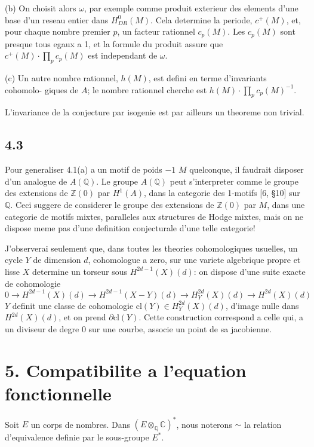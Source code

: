 \documentclass[12pt,a4paper]{article}
\theoremstyle{plain}
\theoremstyle{definition}
\theoremstyle{remark}
\newcommand{\Q}{\mathbb{Q}}
\newcommand{\C}{\mathbb{C}}
\newcommand{\Z}{\mathbb{Z}}
\begin{document}
(b) On choisit alors $\omega$, par exemple comme produit exterieur des elements d'une
base d'un reseau entier dans $H^0_{DR}(M)$. Cela determine la periode, $c^+(M)$, et, pour
chaque nombre premier $p$, un facteur rationnel $c_p(M)$. Les $c_p(M)$ sont presque tous
egaux a 1, et la formule du produit assure que $c^+(M) \cdot \prod_p c_p(M)$ est independant
de $\omega$.

(c) Un autre nombre rationnel, $h(M)$, est defini en terme d'invariants cohomolo-
giques de $A$; le nombre rationnel cherche est $h(M) \cdot \prod_p c_p(M)^{-1}$.

L'invariance de la conjecture par isogenie est par ailleurs un theoreme non trivial.

\subsection*{4.3}

Pour generaliser 4.1(a) a un motif de poids $-1$ $M$ quelconque, il faudrait
disposer d'un analogue de $A(\Q)$. Le groupe $A(\Q)$ peut s'interpreter comme le
groupe des extensions de $\Z(0)$ par $H^1(A)$, dans la categorie des 1-motifs [6, \S 10] sur
$\Q$. Ceci suggere de considerer le groupe des extensions de $\Z(0)$ par $M$, dans une
categorie de motifs mixtes, paralleles aux structures de Hodge mixtes, mais on ne
dispose meme pas d'une definition conjecturale d'une telle categorie!

J'observerai seulement que, dans toutes les theories cohomologiques usuelles, un
cycle $Y$ de dimension $d$, cohomologue a zero, sur une variete algebrique propre et
lisse $X$ determine un torseur sous $H^{2d-1}(X)(d)$: on dispose d'une suite exacte de
cohomologie
\[
0 \to H^{2d-1}(X)(d) \to H^{2d-1}(X - Y)(d) \to H^{2d}_Y(X)(d) \to H^{2d}(X)(d)
\]
$Y$ definit une classe de cohomologie $\text{cl}(Y) \in H^{2d}_Y(X)(d)$, d'image nulle dans
$H^{2d}(X)(d)$, et on prend $\partial \text{cl}(Y)$. Cette construction correspond a celle qui, a un
diviseur de degre 0 sur une courbe, associe un point de sa jacobienne.


\section*{5. Compatibilite a l'equation fonctionnelle}

Soit $E$ un corps de nombres. Dans $(E \otimes_\Q \C)^*$, nous noterons $\sim$ la relation
d'equivalence definie par le sous-groupe $E^*$.
\end{document}
